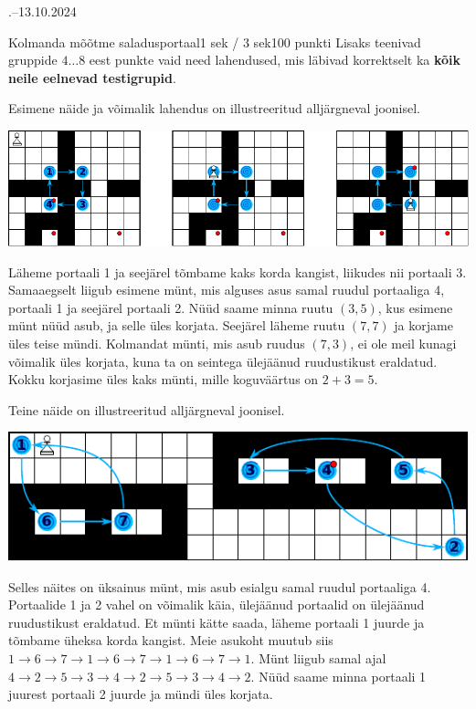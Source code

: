 \documentclass[a4paper,11pt]{article}
\begin{document}
\begin{ol}{\eio}{.--13.10.2024}{\yle}{}
\begin{yl}{5}{Kolmanda mõõtme saladus}{portaal}{1 sek / 3 sek}{100 punkti}
    Lisaks teenivad gruppide $4 \ldots 8$ eest punkte vaid need lahendused, mis läbivad
    korrektselt ka \textbf{kõik neile eelnevad testigrupid}.

    \begin{minipage}[t]{0.5\textwidth}
      \nde[0]{2cm}{2cm}
    \end{minipage}
    \begin{minipage}[t]{0.4\textwidth}
      \ndey[1]{4cm}{2cm}
    \end{minipage}

    Esimene näide ja võimalik lahendus on illustreeritud alljärgneval joonisel.
    \begin{center}
      \includegraphics{sample1.pdf}
    \end{center}
    Läheme portaali 1 ja seejärel tõmbame kaks korda kangist, liikudes nii portaali 3.
    Samaaegselt liigub esimene münt, mis alguses asus samal ruudul portaaliga 4, portaali
    1 ja seejärel portaali 2. Nüüd saame minna ruutu $(3, 5)$, kus esimene münt
    nüüd asub, ja selle üles korjata. Seejärel läheme ruutu $(7, 7)$ ja korjame üles teise
    mündi. Kolmandat münti, mis asub ruudus $(7, 3)$, ei ole meil kunagi võimalik üles korjata,
    kuna ta on seintega ülejäänud ruudustikust eraldatud. Kokku korjasime üles kaks münti,
    mille koguväärtus on $2 + 3 = 5$.

    Teine näide on illustreeritud alljärgneval joonisel.
    \begin{center}
      \includegraphics{sample2.pdf}
    \end{center}
    Selles näites on üksainus münt, mis asub esialgu samal ruudul portaaliga 4. Portaalide
    1 ja 2 vahel on võimalik käia, ülejäänud portaalid on ülejäänud ruudustikust eraldatud.
    Et münti kätte saada, läheme portaali 1 juurde ja tõmbame üheksa korda kangist.
    Meie asukoht muutub siis $1 \to 6 \to 7 \to 1 \to 6 \to 7 \to 1 \to 6 \to 7 \to 1$.
    Münt liigub samal ajal $4 \to 2 \to 5 \to 3 \to 4 \to 2 \to 5 \to 3 \to 4 \to 2$.
    Nüüd saame minna portaali 1 juurest portaali 2 juurde ja mündi üles korjata.
  \end{yl}
\end{ol}
\end{document}
